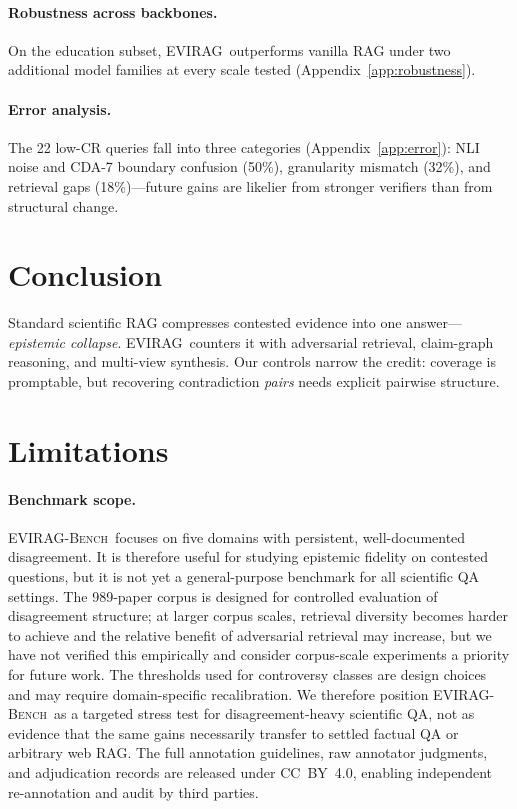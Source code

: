 \documentclass[11pt]{article}
\newcommand{\system}{\textsc{EVIRAG}\xspace}
\newcommand{\bench}{\textsc{EVIRAG-Bench}\xspace}
\begin{document}
\paragraph{Robustness across backbones.}
On the education subset, \system\ outperforms vanilla RAG under two additional
model families at every scale tested (Appendix~\ref{app:robustness}).

\paragraph{Error analysis.}
\label{sec:error}
The 22 low-CR queries fall into three categories (Appendix~\ref{app:error}):
NLI noise and CDA-7 boundary confusion (50\%), granularity mismatch (32\%), and
retrieval gaps (18\%)---future gains are likelier from stronger verifiers than
from structural change.

\section{Conclusion}
\label{sec:conclusion}

Standard scientific RAG compresses contested evidence into one answer---%
\emph{epistemic collapse}.  \system\ counters it with adversarial retrieval,
claim-graph reasoning, and multi-view synthesis.  Our controls narrow the
credit: coverage is promptable, but recovering contradiction \emph{pairs} needs
explicit pairwise structure.

\section*{Limitations}
\label{sec:limits}

\paragraph{Benchmark scope.}
\bench\ focuses on five domains with persistent, well-documented disagreement.
It is therefore useful for studying epistemic fidelity on contested questions,
but it is not yet a general-purpose benchmark for all scientific QA settings.
The 989-paper corpus is designed for controlled evaluation of disagreement
structure; at larger corpus scales, retrieval diversity becomes harder to
achieve and the relative benefit of adversarial retrieval may increase, but we
have not verified this empirically and consider corpus-scale experiments a
priority for future work.
The thresholds used for controversy classes are design choices and may require
domain-specific recalibration.  We therefore position \bench\ as a targeted
stress test for disagreement-heavy scientific QA, not as evidence that the same
gains necessarily transfer to settled factual QA or arbitrary web RAG.
The full annotation guidelines, raw annotator judgments, and adjudication
records are released under CC~BY~4.0, enabling independent re-annotation and
audit by third parties.
\end{document}
